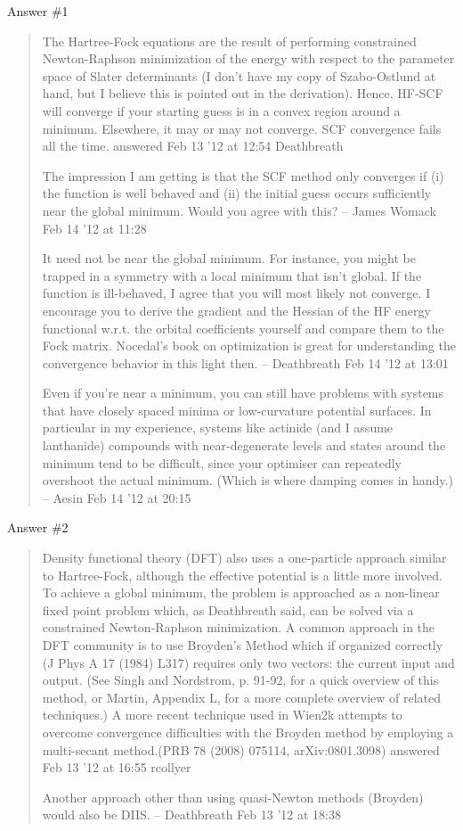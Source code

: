 Answer \#1
\begin{quote}
The Hartree-Fock equations are the result of performing constrained Newton-Raphson minimization of the energy with respect to the parameter space of Slater determinants (I don't have my copy of Szabo-Ostlund at hand, but I believe this is pointed out in the derivation). Hence, HF-SCF will converge if your starting guess is in a convex region around a minimum. Elsewhere, it may or may not converge. SCF convergence fails all the time.
answered Feb 13 '12 at 12:54
Deathbreath

The impression I am getting is that the SCF method only converges if (i) the function is well behaved and (ii) the initial guess occurs sufficiently near the global minimum. Would you agree with this? – James Womack Feb 14 '12 at 11:28

It need not be near the global minimum. For instance, you might be trapped in a symmetry with a local minimum that isn't global. If the function is ill-behaved, I agree that you will most likely not converge. I encourage you to derive the gradient and the Hessian of the HF energy functional w.r.t. the orbital coefficients yourself and compare them to the Fock matrix. Nocedal's book on optimization is great for understanding the convergence behavior in this light then. – Deathbreath Feb 14 '12 at 13:01

Even if you're near a minimum, you can still have problems with systems that have closely spaced minima or low-curvature potential surfaces. In particular in my experience, systems like actinide (and I assume lanthanide) compounds with near-degenerate levels and states around the minimum tend to be difficult, since your optimiser can repeatedly overshoot the actual minimum. (Which is where damping comes in handy.) – Aesin Feb 14 '12 at 20:15
\end{quote}

Answer \#2
\begin{quote}
	Density functional theory (DFT) also uses a one-particle approach similar to Hartree-Fock, although the effective potential is a little more involved. To achieve a global minimum, the problem is approached as a non-linear fixed point problem which, as Deathbreath said, can be solved via a constrained Newton-Raphson minimization. A common approach in the DFT community is to use Broyden's Method which if organized correctly (J Phys A 17 (1984) L317) requires only two vectors: the current input and output. (See Singh and Nordstrom, p. 91-92, for a quick overview of this method, or Martin, Appendix L, for a more complete overview of related techniques.) A more recent technique used in Wien2k attempts to overcome convergence difficulties with the Broyden method by employing a multi-secant method.(PRB 78 (2008) 075114, arXiv:0801.3098)
	answered Feb 13 '12 at 16:55
	rcollyer

	Another approach other than using quasi-Newton methods (Broyden) would also be DIIS. – Deathbreath Feb 13 '12 at 18:38
\end{quote}